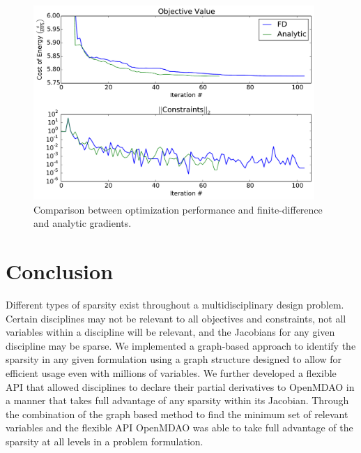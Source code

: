 \documentclass[]{aiaa-tc} %
\begin{document}
        \begin{figure}[!htbp]
          \centering
          \includegraphics[width=0.95\textwidth]{images/wt_opt_progress}
          \caption{Comparison between optimization performance and finite-difference and analytic gradients.}
          \label{fig:wt-opt-progress}
        \end{figure}

        
        

  \section{Conclusion}

      Different types of sparsity exist throughout a multidisciplinary design problem. Certain 
      disciplines may not be relevant to all objectives and constraints, not all variables within a discipline will 
      be relevant, and the Jacobians for any given discipline may be sparse. We implemented a graph-based 
      approach to identify the sparsity in any given formulation using a graph structure designed to allow for 
      efficient usage even with millions of variables. We further developed a flexible API 
      that allowed disciplines to declare their partial derivatives to OpenMDAO in a manner that 
      takes full advantage of any sparsity within its Jacobian. Through the combination of the graph based 
      method to find the minimum set of relevant variables and the flexible API OpenMDAO was able to take full 
      advantage of the sparsity at all levels in a problem formulation.
\end{document}
